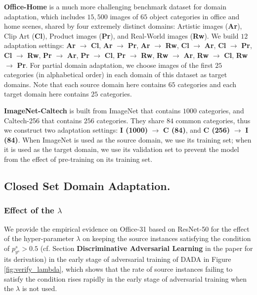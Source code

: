 \documentclass[letterpaper]{article} \usepackage{aaai20}  \usepackage{times}  \usepackage{helvet} \usepackage{courier}  \usepackage[hyphens]{url}  \usepackage{graphicx} \urlstyle{rm} \def\UrlFont{\rm}  \usepackage{graphicx}  \frenchspacing  \setlength{\pdfpagewidth}{8.5in}  \setlength{\pdfpageheight}{11in}
\begin{document}
\noindent\textbf{Office-Home} \cite{office_home} is a much more challenging benchmark dataset for domain adaptation, which includes $15,500$ images of $65$ object categories in office and home scenes, shared by four extremely distinct domains: Artistic images (\textbf{Ar}), Clip Art (\textbf{Cl}), Product images (\textbf{Pr}), and Real-World images (\textbf{Rw}). We build $12$ adaptation settings: \textbf{Ar} $\rightarrow$ \textbf{Cl}, \textbf{Ar} $\rightarrow$ \textbf{Pr}, \textbf{Ar} $\rightarrow$ \textbf{Rw}, \textbf{Cl} $\rightarrow$ \textbf{Ar}, \textbf{Cl} $\rightarrow$ \textbf{Pr}, \textbf{Cl} $\rightarrow$ \textbf{Rw}, \textbf{Pr} $\rightarrow$ \textbf{Ar}, \textbf{Pr} $\rightarrow$ \textbf{Cl}, \textbf{Pr} $\rightarrow$ \textbf{Rw}, \textbf{Rw} $\rightarrow$ \textbf{Ar}, \textbf{Rw} $\rightarrow$ \textbf{Cl}, \textbf{Rw} $\rightarrow$ \textbf{Pr}. For partial domain adaptation, we choose images of the first $25$ categories (in alphabetical order) in each domain of this dataset as target domains. Note that each source domain here contains $65$ categories and each target domain here contains $25$ categories.

\noindent\textbf{ImageNet-Caltech} is built from ImageNet \cite{imagenet} that contains $1000$ categories, and Caltech-256 \cite{caltech256} that contains $256$ categories. They share $84$ common categories, thus we construct two adaptation settings: \textbf{I (1000)} $\rightarrow$ \textbf{C (84)}, and \textbf{C (256)} $\rightarrow$ \textbf{I (84)}. When ImageNet is used as the source domain, we use its training set; when it is used as the target domain, we use its validation set to prevent the model from the effect of pre-training on its training set. 

\subsection{Closed Set Domain Adaptation. }
\subsubsection{Effect of the $\lambda$}
We provide the empirical evidence on Office-31 \cite{office31} based on ResNet-50 \cite{resnet} for the effect of the hyper-parameter $\lambda$ on keeping the source instances satisfying the condition of $p_{y^s}^s>0.5$ (cf. Section \textbf{Discriminative Adversarial Learning} in the paper for its derivation) in the early stage of adversarial training of DADA in Figure \ref{fig:verify_lambda}, which shows that the rate of source instances failing to satisfy the condition rises rapidly in the early stage of adversarial training when the $\lambda$ is not used.
\end{document}
